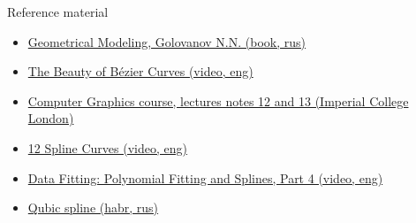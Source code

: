 \documentclass[aspectratio=169]{beamer}
\newcommand{\fbckg}[1]{\usebackgroundtemplate{\texttt{[image: \#1]}}}%
\begin{document}
\begin{frame}[t]{Reference material}
    \Large
    \begin{itemize}
        \item \href{https://libgen.is/book/index.php?md5=D650EF9E78CBCD3367240A00B610C383}{Geometrical Modeling, Golovanov N.N. (book, rus)}
        \item \href{https://youtu.be/aVwxzDHniEw}{The Beauty of Bézier Curves (video, eng)}
        \item \href{http://wp.doc.ic.ac.uk/bkainz/teaching/60005-co317-computer-graphics/}{Computer Graphics course, lectures notes 12 and 13 (Imperial College London)}
        \item \href{https://www.youtube.com/watch?v=lk3uObcVnN0}{12 Spline Curves (video, eng)}
        \item \href{https://youtu.be/rtwOrZL02M0}{Data Fitting: Polynomial Fitting and Splines, Part 4 (video, eng)}
        \item \href{https://habr.com/ru/post/323442/}{Qubic spline (habr, rus)}
    \end{itemize}
\end{frame}

\fbckg{fibeamer/figs/last_page.png}
\frame[plain]{}
\end{document}
